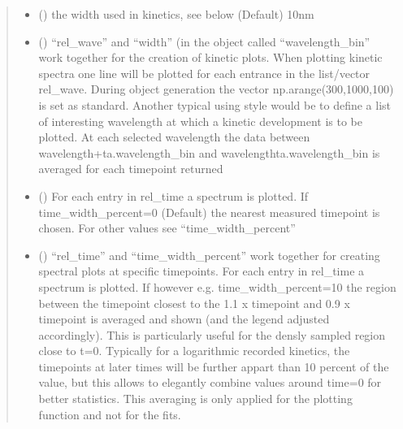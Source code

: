 \documentclass[letterpaper,10pt,english]{sphinxmanual}
\begin{document}
\begin{fulllineitems}
\begin{quote}
\begin{description}
\begin{itemize}
\item {} 
 (\sphinxstyleliteralemphasis{\sphinxupquote{, }}) \textendash{} the width used in kinetics, see below (Default) 10nm

\item {} 
 (\sphinxstyleliteralemphasis{\sphinxupquote{ (}}\sphinxstyleliteralemphasis{\sphinxupquote{)}}\sphinxstyleliteralemphasis{\sphinxupquote{, }}) \textendash{} “rel\_wave” and “width” (in the object called “wavelength\_bin” work together for the creation
of kinetic plots. When plotting kinetic spectra one line will be plotted for each entrance
in the list/vector rel\_wave. During object generation the vector np.arange(300,1000,100)
is set as standard. Another typical using style would be to define a list of interesting
wavelength at which a kinetic development is to be plotted. At each selected wavelength
the data between wavelength+ta.wavelength\_bin and wavelength\sphinxhyphen{}ta.wavelength\_bin is averaged
for each timepoint returned

\item {} 
 (\sphinxstyleliteralemphasis{\sphinxupquote{ (}}\sphinxstyleliteralemphasis{\sphinxupquote{)}}\sphinxstyleliteralemphasis{\sphinxupquote{, }}) \textendash{} For each entry in rel\_time a spectrum is plotted. If time\_width\_percent=0 (Default) the
nearest measured timepoint is chosen. For other values see “time\_width\_percent”

\item {} 
 () \textendash{} “rel\_time” and “time\_width\_percent” work together for creating spectral plots at
specific timepoints. For each entry in rel\_time a spectrum is plotted.
If however e.g. time\_width\_percent=10 the region between the timepoint closest
to the  1.1 x timepoint and 0.9 x timepoint is averaged and shown
(and the legend adjusted accordingly). This is particularly useful for the densly
sampled region close to t=0. Typically for a logarithmic recorded kinetics, the
timepoints at later times will be further appart than 10 percent of the value,
but this allows to elegantly combine values around time=0 for better statistics.
This averaging is only applied for the plotting function and not for the fits.


\end{itemize}
\end{description}
\end{quote}
\end{fulllineitems}
\end{document}
